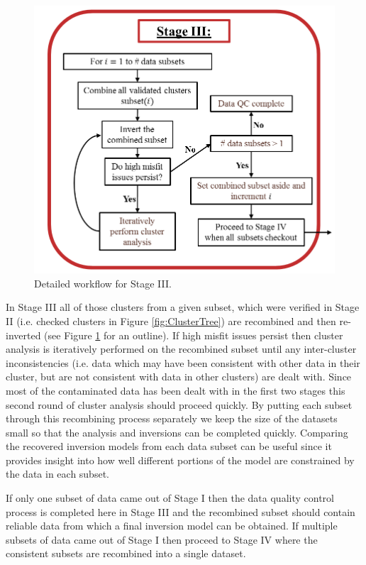 \documentclass[final,authoryear,5p,times,twocolumn]{elsarticle}
\begin{document}
\begin{figure} [!ht]
\begin{center}
   \includegraphics[trim=0cm 0cm 0cm 0cm, clip=true,width=0.8\linewidth]{./Figures/Fig15.pdf}     
\end{center}
\caption{Detailed workflow for Stage III.}
\label{fig:DataQC_workflow_StageIII}
\end{figure}

In Stage III all of those clusters from a given subset, which were verified in Stage II (i.e. checked clusters in Figure \ref{fig:ClusterTree}) are recombined and then re-inverted (see Figure \ref{fig:DataQC_workflow_StageIII} for an outline). If high misfit issues persist then cluster analysis is iteratively performed on the recombined subset until any inter-cluster inconsistencies (i.e. data which may have been consistent with other data in their cluster, but are not consistent with data in other clusters) are dealt with. Since most of the contaminated data has been dealt with in the first two stages this second round of cluster analysis should proceed quickly. By putting each subset through this recombining process separately we keep the size of the datasets small so that the analysis and inversions can be completed quickly. Comparing the recovered inversion models from each data subset can be useful since it provides insight into how well different portions of the model are constrained by the data in each subset.   

If only one subset of data came out of Stage I then the data quality control process is completed here in Stage III and the recombined subset should contain reliable data from which a final inversion model can be obtained. If multiple subsets of data came out of Stage I then proceed to Stage IV where the consistent subsets are recombined into a single dataset. 
\end{document}
